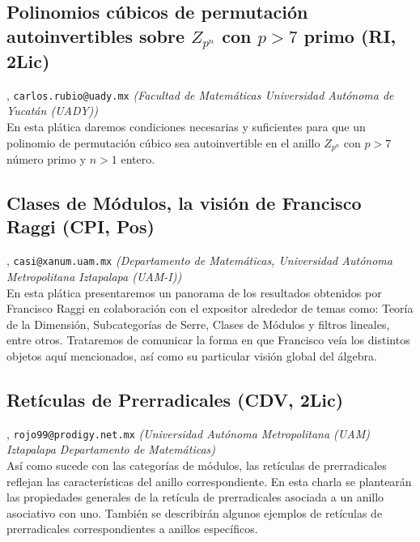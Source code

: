 \subsection{\sffamily Polinomios c\'ubicos de permutaci\'on autoinvertibles sobre $Z_{p^n}$ con $p>7$ primo {\footnotesize (RI, 2Lic)}} \label{reg-400} 
, {\tt carlos.rubio@uady.mx}  {\slshape (Facultad de Matem\'aticas Universidad Aut\'onoma de Yucat\'an (UADY))}\\
          \noindent En esta pl\'atica daremos condiciones necesarias y suficientes para que un polinomio de permutaci\'on c\'ubico sea autoinvertible en el anillo $Z_{p^n}$ con $p>7$ n\'umero primo y $n>1$ entero.
\subsection{\sffamily Clases de M\'odulos, la visi\'on de Francisco Raggi {\footnotesize (CPI, Pos)}} \label{reg-1224} 
, {\tt casi@xanum.uam.mx}  {\slshape (Departamento de Matem\'aticas, Universidad Aut\'onoma Metropolitana Iztapalapa (UAM-I))}\\
          \noindent En esta pl\'atica presentaremos un panorama de los resultados obtenidos por Francisco Raggi en colaboraci\'on con el expositor alrededor de temas como: Teor\'ia de la Dimensi\'on, Subcategor\'ias de Serre, Clases de M\'odulos y filtros lineales, entre otros. Trataremos de comunicar la forma en que Francisco ve\'ia los distintos objetos aqu\'i mencionados, as\'i como su particular visi\'on global del \'algebra.
\subsection{\sffamily Ret\'iculas de Prerradicales {\footnotesize (CDV, 2Lic)}} \label{reg-490} 
, {\tt rojo99@prodigy.net.mx}  {\slshape (Universidad Aut\'onoma Metropolitana (UAM) Iztapalapa Departamento de Matem\'aticas)}\\
          \noindent As\'i como sucede con las categor\'ias de m\'odulos, las ret\'iculas de prerradicales reflejan las caracter\'isticas del anillo correspondiente. En esta charla se plantear\'an las propiedades generales de la ret\'icula de prerradicales asociada a un anillo asociativo con uno. Tambi\'en se describir\'an algunos ejemplos de ret\'iculas de prerradicales correspondientes a anillos espec\'ificos.
